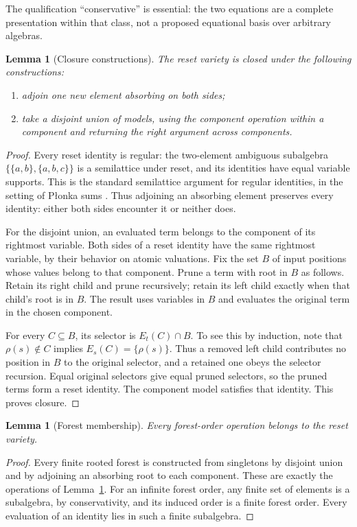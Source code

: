 \documentclass[11pt]{article}
\newtheorem{lemma}[theorem]{Lemma}
\begin{document}
The qualification ``conservative'' is essential: the two equations are
a complete presentation within that class, not a proposed equational
basis over arbitrary algebras.

\begin{lemma}[Closure constructions]\label{lem:closures}
The reset variety is closed under the following constructions:
\begin{enumerate}
\item adjoin one new element absorbing on both sides;
\item take a disjoint union of models, using the component operation
within a component and returning the right argument across components.
\end{enumerate}
\end{lemma}
\begin{proof}
Every reset identity is regular: the two-element ambiguous subalgebra
$\{\{a,b\},\{a,b,c\}\}$ is a semilattice under reset, and its identities
have equal variable supports. This is the standard semilattice argument
for regular identities, in the setting of P{\l}onka sums
\cite{Plonka1967}.
Thus adjoining an absorbing element preserves every identity: either
both sides encounter it or neither does.

For the disjoint union, an evaluated term belongs to the component of
its rightmost variable. Both sides of a reset identity have the same
rightmost variable, by their behavior on atomic valuations. Fix the
set $B$ of input positions whose values belong to that component.
Prune a term with root in $B$ as follows. Retain its right child and
prune recursively; retain its left child exactly when that child's
root is in $B$. The result uses variables in $B$ and evaluates the
original term in the chosen component.

For every $C\subseteq B$, its selector is $E_t(C)\cap B$.
To see this by induction, note that $\rho(s)\notin C$ implies
$E_s(C)=\{\rho(s)\}$. Thus a removed left child contributes no
position in $B$ to the original selector, and a retained one obeys the
selector recursion. Equal original selectors give equal pruned selectors,
so the pruned terms form a reset identity. The component model satisfies
that identity. This proves closure.
\end{proof}

\begin{lemma}[Forest membership]\label{lem:forest-membership}
Every forest-order operation belongs to the reset variety.
\end{lemma}
\begin{proof}
Every finite rooted forest is constructed from singletons by disjoint
union and by adjoining an absorbing root to each component. These are
exactly the operations of Lemma~\ref{lem:closures}.
For an infinite forest order, any finite set of elements is a subalgebra,
by conservativity, and its induced order is a finite forest order.
Every evaluation of an identity lies in such a finite subalgebra.
\end{proof}
\end{document}
